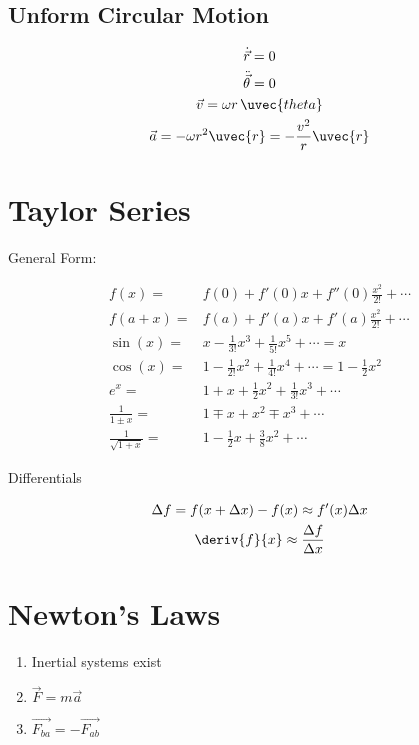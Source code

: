 \documentclass{notes}
\begin{document}
\subsection{Unform Circular Motion}

\begin{gather}
    \dot{\vec{r}} = 0\\
    \ddot{\vec{\theta}} = 0\\
    \vec{v} = \omega r \, \uvec{theta}\\
    \vec{a} = -\omega r^2 \uvec{r} = -\frac{v^2}{r} \uvec{r}
\end{gather}

\section{Taylor Series}

General Form:

\begin{align}
    f(x) =& f(0)+ f'(0)x+f''(0)\frac{x^2}{2!} + \cdots\\
    f(a+x) =& f(a) + f'(a)x + f'(a)\frac{x^2}{2!} + \cdots\\
    \sin(x) =& x-\frac{1}{3!}x^3 + \frac{1}{5!}x^5 + \cdots = x\\
    \cos(x) =& 1-\frac{1}{2!}x^2 + \frac{1}{4!}x^4 + \cdots = 1-\frac{1}{2}x^2\\
    e^x =& 1+x+ \frac{1}{2}x^2+\frac{1}{3!}x^3 + \cdots\\
    \frac{1}{1\pm x} =& 1 \mp x + x^2 \mp x^3 + \cdots\\
    \frac{1}{\sqrt{1+x}} =& 1 - \frac{1}{2}x + \frac{3}{8}x^2 + \cdots
\end{align}

Differentials

\begin{gather}
    \Delta f = f(x + \Delta x) - f(x) \approx f'(x)\Delta x\\
    \deriv{f}{x} \approx \frac{\Delta f}{\Delta x}
\end{gather}

\section{Newton's Laws}

\begin{enumerate}
    \item Inertial systems exist
    \item \(\vec{F} = m \vec{a}\)
    \item \(\vec{F_{ba}} = -\vec{F_{ab}}\)
\end{enumerate}
\end{document}
